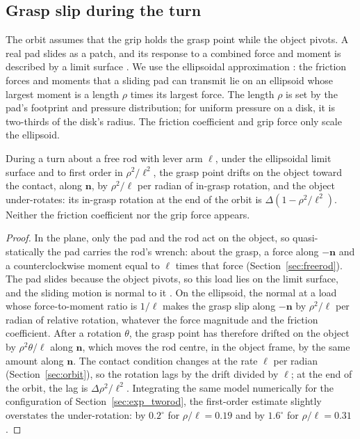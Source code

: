\subsection{Grasp slip during the turn}
\label{sec:slip}

The orbit assumes that the grip holds the grasp point while the object pivots. A real pad slides as a patch, and its response to a combined force and moment is described by a limit surface \cite{goyal1991planar}. We use the ellipsoidal approximation \cite{howe1996practical,xydas1999modeling}: the friction forces and moments that a sliding pad can transmit lie on an ellipsoid whose largest moment is a length $\rho$ times its largest force. The length $\rho$ is set by the pad's footprint and pressure distribution; for uniform pressure on a disk, it is two-thirds of the disk's radius. The friction coefficient and grip force only scale the ellipsoid.

\begin{proposition}
\label{prop:slip}
During a turn about a free rod with lever arm $\ell$, under the ellipsoidal limit surface and to first order in $\rho^2/\ell^2$, the grasp point drifts on the object toward the contact, along $\mathbf n$, by $\rho^2/\ell$ per radian of in-grasp rotation, and the object under-rotates: its in-grasp rotation at the end of the orbit is $\Delta(1-\rho^2/\ell^2)$. Neither the friction coefficient nor the grip force appears.
\end{proposition}
\begin{proof}
In the plane, only the pad and the rod act on the object, so quasi-statically the pad carries the rod's wrench: about the grasp, a force along $-\mathbf n$ and a counterclockwise moment equal to $\ell$ times that force (Section~\ref{sec:freerod}). The pad slides because the object pivots, so this load lies on the limit surface, and the sliding motion is normal to it \cite{goyal1991planar}. On the ellipsoid, the normal at a load whose force-to-moment ratio is $1/\ell$ makes the grasp slip along $-\mathbf n$ by $\rho^2/\ell$ per radian of relative rotation, whatever the force magnitude and the friction coefficient. After a rotation $\theta$, the grasp point has therefore drifted on the object by $\rho^2\theta/\ell$ along $\mathbf n$, which moves the rod centre, in the object frame, by the same amount along $\mathbf n$. The contact condition changes at the rate $\ell$ per radian (Section~\ref{sec:orbit}), so the rotation lags by the drift divided by $\ell$; at the end of the orbit, the lag is $\Delta\rho^2/\ell^2$. Integrating the same model numerically for the configuration of Section~\ref{sec:exp_tworod}, the first-order estimate slightly overstates the under-rotation: by $0.2^{\circ}$ for $\rho/\ell=0.19$ and by $1.6^{\circ}$ for $\rho/\ell=0.31$.
\end{proof}


